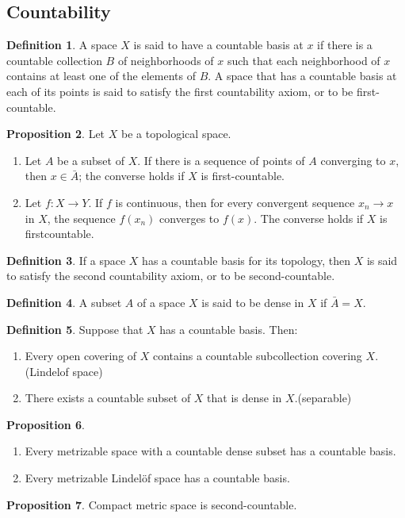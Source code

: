 \documentclass[12pt,a4paper]{book}
\newenvironment{enu}{\begin{enumerate}[(1)]}{\end{enumerate}}
\theoremstyle{definition}
\newtheorem{defn}{Definition}[section]
\newtheorem{prop}[defn]{Proposition}
\begin{document}
\subsection{Countability}
\begin{defn}
    A space $X$ is said to have a countable basis at $x$ if there is a countable collection $B$ of neighborhoods of $x$ such that each neighborhood of $x$ contains at least one of the elements of $B$. A space that has a countable basis at each of its points is said to satisfy the first countability axiom,
    or to be first-countable.
\end{defn}
\begin{prop}
    Let $X$ be a topological space.
    \begin{enu}
        \item Let $A$ be a subset of $X$. If there is a sequence of points of $A$ converging to $x$, then $x \in \bar{A}$; the converse holds if $X$ is first-countable.
        \item Let $f: X \rightarrow Y$. If $f$ is continuous, then for every convergent sequence $x_n \rightarrow x$ in $X$, the sequence $f\left(x_n\right)$ converges to $f(x)$. The converse holds if $X$ is firstcountable.
    \end{enu}
\end{prop}
\begin{defn}
    If a space $X$ has a countable basis for its topology, then $X$ is said to satisfy the second countability axiom, or to be second-countable.
\end{defn}
\begin{defn}
    A subset $A$ of a space $X$ is said to be dense in $X$ if $\bar{A}=X$.
\end{defn}
\begin{defn}
    Suppose that $X$ has a countable basis. Then:
    \begin{enu}
        \item Every open covering of $X$ contains a countable subcollection covering $X$.(Lindelof space)
        \item There exists a countable subset of $X$ that is dense in $X$.(separable)
    \end{enu}
\end{defn}
\begin{prop}
    \begin{enu}
        \item Every metrizable space with a countable dense subset has a countable basis.
        \item Every metrizable Lindelöf space has a countable basis.
    \end{enu}
\end{prop}
\begin{prop}
    Compact metric space is second-countable. 
    \label{proposition: compact metric, C2}
\end{prop}
\end{document}
